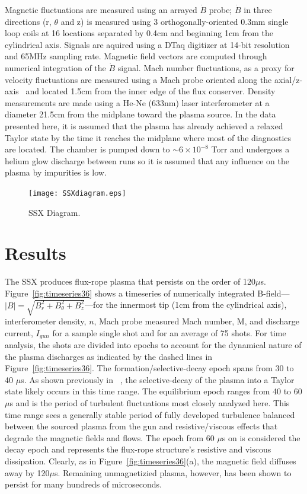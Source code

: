 \documentclass[12pt]{iopart}
\begin{document}
Magnetic fluctuations are measured using an arrayed $\dot{B}$ probe; $\dot{B}$ in three directions (r, $\theta$ and z) is measured using 3 orthogonally-oriented 0.3mm single loop coils at 16 locations separated by 0.4cm and beginning 1cm from the cylindrical axis. Signals are aquired using a DTaq digitizer at 14-bit resolution and 65MHz sampling rate. Magnetic field vectors are computed through numerical integration of the $\dot{B}$ signal. Mach number fluctuations, as a proxy for velocity fluctuations are measured using a Mach probe oriented along the axial/z-axis~\cite{Zhang11} and located 1.5cm from the inner edge of the flux conserver. Density measurements are made using a He-Ne (633nm) laser interferometer at a diameter 21.5cm from the midplane toward the plasma source. In the data presented here, it is assumed that the plasma has already achieved a relaxed Taylor state by the time it reaches the midplane where most of the diagnostics are located. The chamber is pumped down to $\sim 6 \times 10^{-8}$ Torr and undergoes a helium glow discharge between runs so it is assumed that any influence on the plasma by impurities is low.

\begin{figure}[!htbp]
\centerline{
\texttt{[image: SSXdiagram.eps]}}
\caption{\label{fig:SSXdiagram} SSX Diagram.}
\end{figure}

\section{Results}

The SSX produces flux-rope plasma that persists on the order of 120$\mu$s. Figure~\ref{fig:timeseries36} shows a timeseries of numerically integrated B-field---$|B|=\sqrt{B_{r}^{2}+B_{\theta}^{2}+B_{z}^{2}}$---for the innermost tip (1cm from the cylindrical axis), interferometer density, $n$, Mach probe measured Mach number, M, and discharge current, $I_{gun}$ for a sample single shot and for an average of 75 shots. For time analysis, the shots are divided into epochs to account for the dynamical nature of the plasma discharges as indicated by the dashed lines in Figure~\ref{fig:timeseries36}. The formation/selective-decay epoch spans from 30 to 40 $\mu$s. As shown previously in ~\cite{Gray13}, the selective-decay of the plasma into a Taylor state likely occurs in this time range. The equilibrium epoch ranges from 40 to 60 $\mu$s and is the period of turbulent fluctuations most closely analyzed here. This time range sees a generally stable period of fully developed turbulence balanced between the sourced plasma from the gun and resistive/viscous effects that degrade the magnetic fields and flows. The epoch from 60 $\mu$s on is considered the decay epoch and represents the flux-rope structure's resistive and viscous dissipation. Clearly, as in Figure~\ref{fig:timeseries36}(a), the magnetic field diffuses away by 120$\mu$s. Remaining unmagnetizied plasma, however, has been shown to persist for many hundreds of microseconds.
\end{document}
